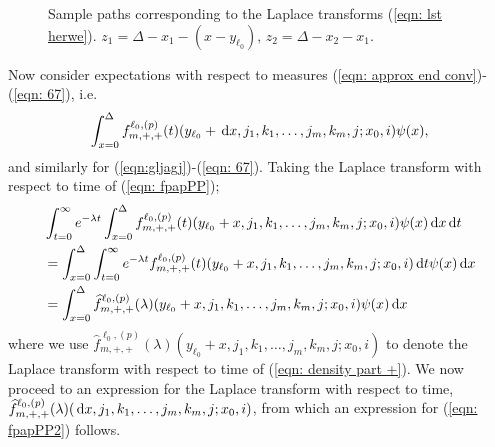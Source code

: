 \begin{figure}
    \caption{\label{fig: sample paths lst} Sample paths corresponding to the Laplace transforms (\ref{eqn: lst herwe}). \(z_1 = \Delta - x_1-(x-y_{\ell_0}),\, z_2= \Delta - x_2-x_1\).}
\end{figure}

Now consider expectations with respect to measures (\ref{eqn: approx end conv})-(\ref{eqn: 67}), i.e. 
\begin{align}
	\int_{x=0}^\Delta f^{\ell_0,(p)}_{m,+,+}(t)( y_{\ell_0} + \, \mathrm{d} x, j_1,k_1,\dots,j_m,k_m, j; x_0,i) \psi(x), \label{eqn: fpapPP}
\end{align}
and similarly for (\ref{eqn:gljagj})-(\ref{eqn: 67}). Taking the Laplace transform with respect to time of (\ref{eqn: fpapPP});
\begin{align}
	&\int_{t=0}^\infty e^{-\lambda t}\int_{x=0}^\Delta f^{\ell_0,(p)}_{m,+,+}(t)( y_{\ell_0} + x, j_1,k_1,\dots,j_m,k_m, j; x_0,i) \psi(x)\, \mathrm{d} x \, \mathrm{d} t \nonumber 
	\\&= \int_{x=0}^\Delta \int_{t=0}^\infty e^{-\lambda t} f^{\ell_0,(p)}_{m,+,+}(t)( y_{\ell_0} + x, j_1,k_1,\dots,j_m,k_m, j; x_0,i)  \, \mathrm{d} t \psi(x) \, \mathrm{d} x \nonumber 
	\\&= \int_{x=0}^\Delta \widehat f^{\ell_0,(p)}_{m,+,+}(\lambda)( y_{\ell_0} + x, j_1,k_1,\dots,j_m,k_m, j; x_0,i) \psi(x) \, \mathrm{d} x \label{eqn: fpapPP2}
\end{align}
where we use \(\widehat f^{\ell_0,(p)}_{m,+,+}(\lambda)( y_{\ell_0} + x, j_1,k_1,\dots,j_m,k_m, j; x_0,i) \) to denote the Laplace transform with respect to time of (\ref{eqn: density part +}). We now proceed to an expression for the Laplace transform with respect to time, \(\widehat f^{\ell_0,(p)}_{m,+,+}(\lambda)( \, \mathrm{d} x, j_1,k_1,\dots,j_m,k_m, j; x_0,i) \), from which an expression for (\ref{eqn: fpapPP2}) follows. 

